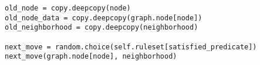 \begin{lstlisting}[float=p, caption={Applying a random move enabled by the satisfied predicate.}, label={lst:daemon-apply-move}]
old_node = copy.deepcopy(node)
old_node_data = copy.deepcopy(graph.node[node])
old_neighborhood = copy.deepcopy(neighborhood)

next_move = random.choice(self.ruleset[satisfied_predicate])
next_move(graph.node[node], neighborhood)
\end{lstlisting}


